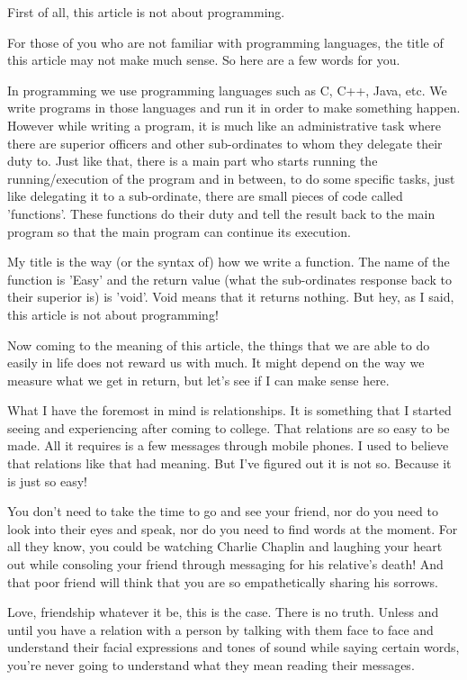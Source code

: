 \documentclass[twoside,11pt]{article}
\begin{document}
First of all, this article is not about programming.

For those of you who are not familiar with programming languages, the title of this article may not make much sense. So here are a few words for you.

In programming we use programming languages such as C, C++, Java, etc. We write programs in those languages and run it in order to make something happen. However while writing a program, it is much like an administrative task where there are superior officers and other sub-ordinates to whom they delegate their duty to. Just like that, there is a main part who starts running the running/execution of the program and in between, to do some specific tasks, just like delegating it to a sub-ordinate, there are small pieces of code called 'functions'. These functions do their duty and tell the result back to the main program so that the main program can continue its execution.

My title is the way (or the syntax of) how we write a function. The name of the function is 'Easy' and the return value (what the sub-ordinates response back to their superior is) is 'void'. Void means that it returns nothing. But hey, as I said, this article is not about programming!

Now coming to the meaning of this article, the things that we are able to do easily in life does not reward us with much. It might depend on the way we measure what we get in return, but let's see if I can make sense here.

What I have the foremost in mind is relationships. It is something that I started seeing and experiencing after coming to college. That relations are so easy to be made. All it requires is a few messages through mobile phones. I used to believe that relations like that had meaning. But I've figured out it is not so. Because it is just so easy!

You don't need to take the time to go and see your friend, nor do you need to look into their eyes and speak, nor do you need to find words at the moment. For all they know, you could be watching Charlie Chaplin and laughing your heart out while consoling your friend through messaging for his relative's death! And that poor friend will think that you are so empathetically sharing his sorrows.

Love, friendship whatever it be, this is the case. There is no truth. Unless and until you have a relation with a person by talking with them face to face and understand their facial expressions and tones of sound while saying certain words, you're never going to understand what they mean reading their messages.
\end{document}
